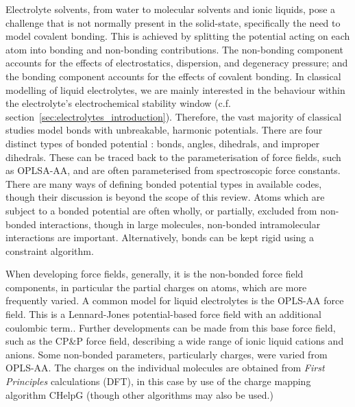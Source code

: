 \documentclass[../main.tex]{subfiles}
\begin{document}
Electrolyte solvents, from water to molecular solvents and ionic liquids, pose a challenge that is not normally present in the solid-state, specifically the need to model covalent bonding. This is achieved by splitting the potential acting on each atom into bonding and non-bonding contributions. The non-bonding component accounts for the effects of electrostatics, dispersion, and degeneracy pressure; and the bonding component accounts for the effects of covalent bonding. In classical modelling of liquid electrolytes, we are mainly interested in the behaviour within the electrolyte's electrochemical stability window (c.f. section~\ref{sec:electrolytes_introduction}). Therefore, the vast majority of classical studies model bonds with unbreakable, harmonic potentials. There are four distinct types of bonded potential \cite{lindahl_gromacs_2021, frenkel_understanding_2002}: bonds, angles, dihedrals, and improper dihedrals. These can be traced back to the parameterisation of force fields, such as OPLSA-AA,\cite{canongia_lopes_clp_2012, jorgensen_development_1996} and are often parameterised from spectroscopic force constants. There are many ways of defining bonded potential types in available codes,\cite{lindahl_gromacs_2021,PLIMPTON19951} though their discussion is beyond the scope of this review. Atoms which are subject to a bonded potential are often wholly, or partially, excluded from non-bonded interactions, though in large molecules, non-bonded intramolecular interactions are important. Alternatively, bonds can be kept rigid using a constraint algorithm.\cite{hess_lincs_1997,ryckaert_numerical_1977,andersen_rattle_1983}

When developing force fields, generally, it is the non-bonded force field components, in particular the partial charges on atoms, which are more frequently varied. A common model for liquid electrolytes is the OPLS-AA force field.\cite{jorgensen_development_1996} This is a Lennard-Jones potential-based force field with an additional coulombic term.\cite{ewald_berechnung_1921,darden_particle_1993,deserno_how_1998,yeh_ewald_1999}.
Further developments can be made from this base force field, such as the CP\&P force field,\cite{canongia_lopes_clp_2012, canongia_lopes_modeling_2004, canongia_lopes_molecular_2004, canongia_lopes_molecular_2006} describing a wide range of ionic liquid cations and anions. Some non-bonded parameters, particularly charges, were varied from OPLS-AA. The charges on the individual molecules are obtained from \textit{First Principles} calculations (DFT), in this case by use of the charge mapping algorithm CHelpG\cite{canongia_lopes_clp_2012} (though other algorithms may also be used.\cite{spackman_potential_1996,breneman_determining_1990,singh_approach_1984}) 
\end{document}
